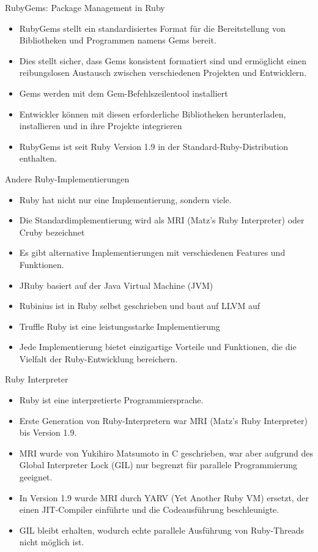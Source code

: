 \documentclass{beamer}
\begin{document}
\begin{frame}{RubyGems: Package Management in Ruby}
  \begin{itemize}
    \item RubyGems stellt ein standardisiertes Format für die Bereitstellung von Bibliotheken und Programmen namens Gems bereit.
  
    \item Dies stellt sicher, dass Gems konsistent formatiert sind und ermöglicht einen reibungslosen Austausch zwischen verschiedenen Projekten und Entwicklern.
    \item Gems werden mit dem Gem-Befehlszeilentool installiert
    \item Entwickler können mit diesen erforderliche Bibliotheken herunterladen, installieren und in ihre Projekte integrieren
    \item RubyGems ist seit Ruby Version 1.9 in der Standard-Ruby-Distribution enthalten.
  \end{itemize}
\end{frame}
\begin{frame}{Andere Ruby-Implementierungen}
  \begin{itemize}
    \item Ruby hat nicht nur eine Implementierung, sondern viele.
    \item Die Standardimplementierung wird als MRI (Matz's Ruby Interpreter) oder Cruby bezeichnet
    \item Es gibt alternative Implementierungen mit verschiedenen Features und Funktionen.
    \item JRuby basiert auf der Java Virtual Machine (JVM) 
    \item Rubinius ist in Ruby selbst geschrieben und baut auf LLVM auf
    \item Truffle Ruby ist eine leistungsstarke Implementierung
    \item Jede Implementierung bietet einzigartige Vorteile und Funktionen, die die Vielfalt der Ruby-Entwicklung bereichern.
    
  \end{itemize}
\end{frame}
\begin{frame}{Ruby Interpreter}
  \begin{itemize}
    \item Ruby ist eine interpretierte Programmiersprache.
    \item Erste Generation von Ruby-Interpretern war MRI (Matz's Ruby Interpreter) bis Version 1.9.
    \item MRI wurde von Yukihiro Matsumoto in C geschrieben, war aber aufgrund des Global Interpreter Lock (GIL) nur begrenzt für parallele Programmierung geeignet.
    \item In Version 1.9 wurde MRI durch YARV (Yet Another Ruby VM) ersetzt, der einen JIT-Compiler einführte und die Codeausführung beschleunigte.
    \item GIL bleibt erhalten, wodurch echte parallele Ausführung von Ruby-Threads nicht möglich ist.
   
  \end{itemize}
\end{frame}
\end{document}
